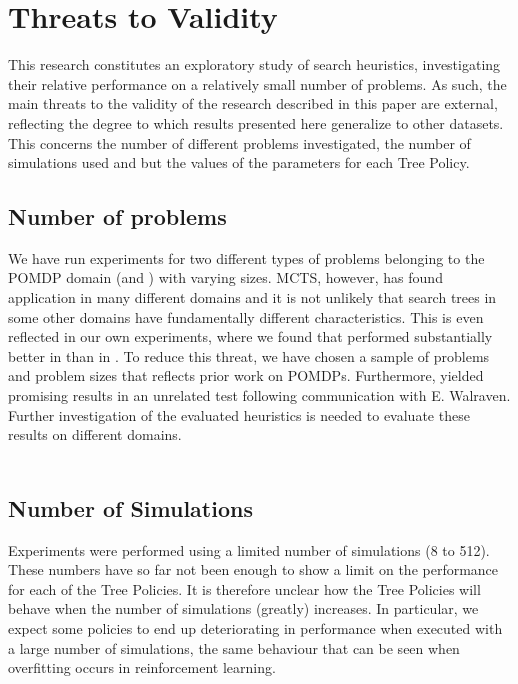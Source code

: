 \section{Threats to Validity}
This research constitutes an exploratory study of search heuristics, investigating their relative performance on a relatively small number of problems. As such, the main threats to the validity of the research described in this paper are external, reflecting the degree to which results presented here generalize to other datasets. This concerns the number of different problems investigated, the number of simulations used  and but the values of the parameters for each Tree Policy.

\subsection{Number of problems}
We have run experiments for two different types of problems belonging to the POMDP domain (\rock and \poc) with varying sizes. MCTS, however, has found application in many different domains and it is not unlikely that search trees in some other domains have fundamentally different characteristics. This is even reflected in our own experiments, where we found that \eroulette performed substantially better in \rock than in \poc. To reduce this threat, we have chosen a sample of problems and problem sizes that reflects prior work on POMDPs. Furthermore, \rsoft yielded promising results in an unrelated test following communication with E. Walraven. Further investigation of the evaluated heuristics is needed to evaluate these results on different domains. \\ \\

\subsection{Number of Simulations}
Experiments were performed using a limited number of simulations (8 to 512). These numbers have so far not been enough to show a limit on the performance for each of the Tree Policies. It is therefore unclear how the Tree Policies will behave when the number of simulations (greatly) increases. In particular, we expect some policies to end up deteriorating in performance when executed with a large number of simulations, the same behaviour that can be seen when overfitting occurs in reinforcement learning.

